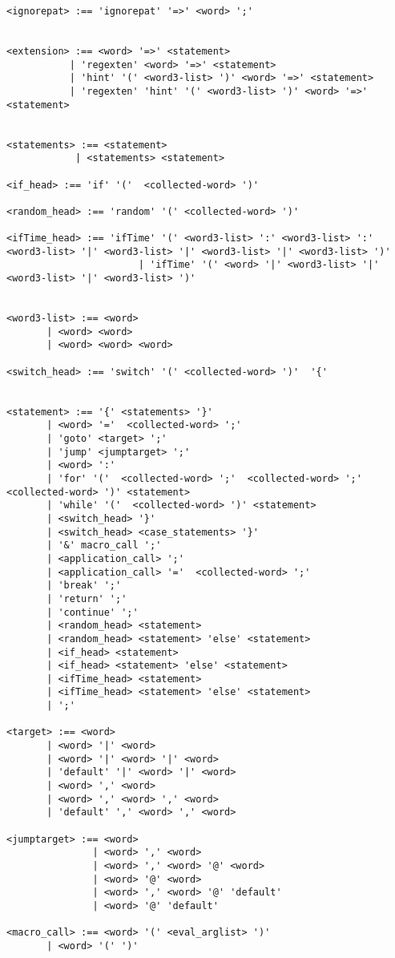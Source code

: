 {\begin{verbatim}
<ignorepat> :== 'ignorepat' '=>' <word> ';'


<extension> :== <word> '=>' <statement>
           | 'regexten' <word> '=>' <statement>
           | 'hint' '(' <word3-list> ')' <word> '=>' <statement>
           | 'regexten' 'hint' '(' <word3-list> ')' <word> '=>' <statement>


<statements> :== <statement>
            | <statements> <statement>

<if_head> :== 'if' '('  <collected-word> ')'

<random_head> :== 'random' '(' <collected-word> ')'

<ifTime_head> :== 'ifTime' '(' <word3-list> ':' <word3-list> ':' <word3-list> '|' <word3-list> '|' <word3-list> '|' <word3-list> ')'
                       | 'ifTime' '(' <word> '|' <word3-list> '|' <word3-list> '|' <word3-list> ')'


<word3-list> :== <word>
       | <word> <word>
       | <word> <word> <word>

<switch_head> :== 'switch' '(' <collected-word> ')'  '{'


<statement> :== '{' <statements> '}'
       | <word> '='  <collected-word> ';'
       | 'goto' <target> ';'
       | 'jump' <jumptarget> ';'
       | <word> ':'
       | 'for' '('  <collected-word> ';'  <collected-word> ';' <collected-word> ')' <statement>
       | 'while' '('  <collected-word> ')' <statement>
       | <switch_head> '}'
       | <switch_head> <case_statements> '}'
       | '&' macro_call ';'
       | <application_call> ';'
       | <application_call> '='  <collected-word> ';'
       | 'break' ';'
       | 'return' ';'
       | 'continue' ';'
       | <random_head> <statement>
       | <random_head> <statement> 'else' <statement>
       | <if_head> <statement>
       | <if_head> <statement> 'else' <statement>
       | <ifTime_head> <statement>
       | <ifTime_head> <statement> 'else' <statement>
       | ';'

<target> :== <word>
       | <word> '|' <word>
       | <word> '|' <word> '|' <word>
       | 'default' '|' <word> '|' <word>
       | <word> ',' <word>
       | <word> ',' <word> ',' <word>
       | 'default' ',' <word> ',' <word>

<jumptarget> :== <word>
               | <word> ',' <word>
               | <word> ',' <word> '@' <word>
               | <word> '@' <word>
               | <word> ',' <word> '@' 'default'
               | <word> '@' 'default'

<macro_call> :== <word> '(' <eval_arglist> ')'
       | <word> '(' ')'


\end{verbatim}}

